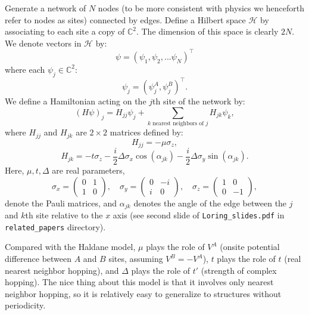 \documentclass[a4paper]{article}
\begin{document}
\noindent Generate a network of $N$ nodes (to be more consistent with physics we henceforth refer to nodes as sites) connected by edges. Define a Hilbert space $\mathcal{H}$ by associating to each site a copy of $\mathbb{C}^2$. The dimension of this space is clearly $2 N$. We denote vectors in $\mathcal{H}$ by:
\begin{equation}
	\psi = \left( \psi_1, \psi_2, ... \psi_N \right)^\top
\end{equation}
where each $\psi_j \in \mathbb{C}^2$:
\begin{equation}
	\psi_j = \left( \psi_j^A , \psi_j^B \right)^\top.
\end{equation}
We define a Hamiltonian acting on the $j$th site of the network by:
\begin{equation}
	( H \psi )_j = H_{jj} \psi_j + \sum_{ k \text{ nearest neighbors of } j } H_{jk} \psi_k,
\end{equation}
where $H_{jj}$ and $H_{jk}$ are $2 \times 2$ matrices defined by:
\begin{equation}
	H_{jj} = - \mu \sigma_z,
\end{equation}
\begin{equation}
	H_{jk} = - t \sigma_z - \frac{ i }{ 2 } \Delta \sigma_x \cos( \alpha_{jk} ) - \frac{ i }{ 2 } \Delta \sigma_y \sin( \alpha_{jk} ).
\end{equation}
Here, $\mu, t, \Delta$ are real parameters,
\begin{equation}
	\sigma_x = \begin{pmatrix} 0 & 1 \\ 1 & 0 \end{pmatrix}, \quad \sigma_y = \begin{pmatrix} 0 & - i \\ i & 0 \end{pmatrix}, \quad \sigma_z = \begin{pmatrix} 1 & 0 \\ 0 & -1 \end{pmatrix},
\end{equation}
denote the Pauli matrices, and $\alpha_{jk}$ denotes the angle of the edge between the $j$ and $k$th site relative to the $x$ axis (see second slide of \verb|Loring_slides.pdf| in \verb|related_papers| directory).

Compared with the Haldane model, $\mu$ plays the role of $V^A$ (onsite potential difference between $A$ and $B$ sites, assuming $V^B = - V^A$), $t$ plays the role of $t$ (real nearest neighbor hopping), and $\Delta$ plays the role of $t'$ (strength of complex hopping). The nice thing about this model is that it involves only nearest neighbor hopping, so it is relatively easy to generalize to structures without periodicity.
\end{document}
